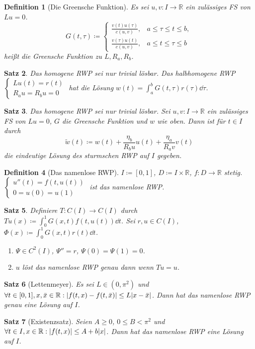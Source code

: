 \documentclass[a4paper]{article}
\newcounter{Sec}
\theoremstyle{marginbreak}
\newtheorem{definition}{Definition}[Sec]
\newtheorem{satz}[definition]{Satz}
\newcommand{\R}{\mathbb{R}}
\begin{document}
	\begin{definition}[Die Greensche Funktion]
		Es sei $u, v\colon I\to\R$ ein zulässiges FS von $Lu=0$.
		\[G(t,\tau)\coloneqq\begin{cases}\frac{v(t)u(\tau)}{c(u, v)}, &a\leq\tau\leq t\leq b,\\
			\frac{v(\tau)u(t)}{c(u, v)}, &a\leq t\leq\tau\leq b\end{cases}
		\]
		heißt die Greensche Funktion zu $L, R_a, R_b$.
	\end{definition}
	\begin{satz}
		Das homogene RWP sei nur trivial lösbar.
		Das halbhomogene RWP $\begin{cases}Lu(t)=r(t)\\R_au=R_bu=0\end{cases}$ hat die Lösung
		$w(t)=\int_a^b G(t,\tau)r(\tau)\dd{\tau}$.
	\end{satz}
	\begin{satz}
		Das homogene RWP sei nur trivial lösbar. Sei $u, v\colon I\to\R$ ein zulässiges FS
		von $Lu=0$, $G$ die Greensche Funktion und $w$ wie oben. Dann ist für $t\in I$ durch
		\[
			\tilde{w}(t)\coloneqq w(t)+\frac{\eta_b}{R_bu}u(t)+\frac{\eta_a}{R_av}v(t)
		\]
		die eindeutige Lösung des sturmschen RWP auf $I$ gegeben.
	\end{satz}
	\begin{definition}[Das namenlose RWP]
		$I\coloneqq [0, 1]$, $D\coloneqq I\times\R$, $f\colon D\to\R$ stetig.
		$\begin{cases}u''(t)=f(t,u(t))\\0=u(0)=u(1)\end{cases}$ ist das namenlose RWP.
	\end{definition}
	\begin{satz}
		Definiere $T\colon C(I)\to C(I)$ durch $Tu(x)\coloneqq\int_0^1G(x, t)f(t, u(t))\dd{t}$.
		Sei $r, u\in C(I)$, $\Phi(x)\coloneqq\int_0^1G(x, t)r(t)\dd{t}$.
		\begin{enumerate}[label=(\alph*)]
			\item $\Psi\in C^2(I)$, $\Psi''=r$, $\Psi(0)=\Psi(1)=0$.
			\item $u$ löst das namenlose RWP genau dann wenn $Tu=u$.
		\end{enumerate}
	\end{satz}
	\begin{satz}[Lettenmeyer]
		Es sei $L\in(0,\pi^2)$ und $\forall t\in[0,1], x, \bar{x}\in\R:\abs{f(t, x)-f(t,\bar{x})}\leq L\abs{x-\bar{x}}$.
		Dann hat das namenlose RWP genau eine Lösung auf $I$.
	\end{satz}
	\begin{satz}[Existenzsatz]
		Seien $A\geq 0$, $0\leq B<\pi^2$ und $\forall t\in I, x\in\R:\abs{f(t, x)}\leq A+b\abs{x}$. Dann
		hat das namenlose RWP eine Lösung auf $I$.
	\end{satz}
\end{document}
